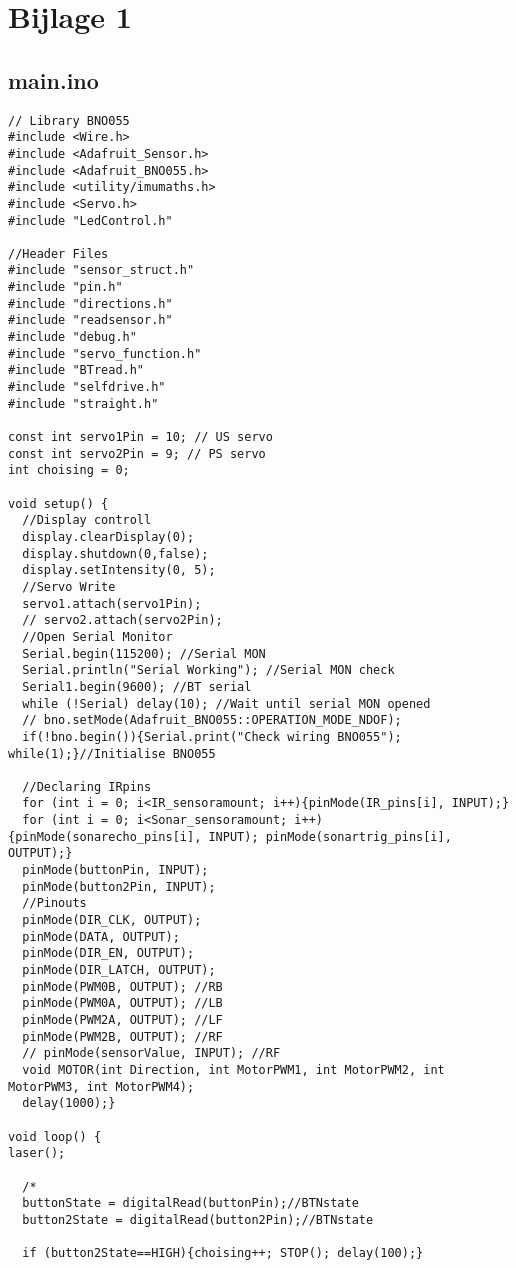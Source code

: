 \section{Bijlage 1}
\subsection{main.ino}
\begin{lstlisting}
// Library BNO055
#include <Wire.h>
#include <Adafruit_Sensor.h>
#include <Adafruit_BNO055.h>
#include <utility/imumaths.h>
#include <Servo.h>
#include "LedControl.h"

//Header Files
#include "sensor_struct.h"	
#include "pin.h"
#include "directions.h"
#include "readsensor.h"
#include "debug.h"
#include "servo_function.h"
#include "BTread.h"
#include "selfdrive.h"
#include "straight.h"

const int servo1Pin = 10; // US servo
const int servo2Pin = 9; // PS servo
int choising = 0;

void setup() {
  //Display controll 
  display.clearDisplay(0);
  display.shutdown(0,false);
  display.setIntensity(0, 5); 
  //Servo Write
  servo1.attach(servo1Pin);
  // servo2.attach(servo2Pin);
  //Open Serial Monitor
  Serial.begin(115200); //Serial MON
  Serial.println("Serial Working"); //Serial MON check
  Serial1.begin(9600); //BT serial
  while (!Serial) delay(10); //Wait until serial MON opened
  // bno.setMode(Adafruit_BNO055::OPERATION_MODE_NDOF);
  if(!bno.begin()){Serial.print("Check wiring BNO055"); while(1);}//Initialise BNO055
  
  //Declaring IRpins
  for (int i = 0; i<IR_sensoramount; i++){pinMode(IR_pins[i], INPUT);}
  for (int i = 0; i<Sonar_sensoramount; i++){pinMode(sonarecho_pins[i], INPUT); pinMode(sonartrig_pins[i], OUTPUT);}
  pinMode(buttonPin, INPUT);
  pinMode(button2Pin, INPUT);
  //Pinouts
  pinMode(DIR_CLK, OUTPUT);
  pinMode(DATA, OUTPUT);
  pinMode(DIR_EN, OUTPUT);
  pinMode(DIR_LATCH, OUTPUT);
  pinMode(PWM0B, OUTPUT); //RB
  pinMode(PWM0A, OUTPUT); //LB
  pinMode(PWM2A, OUTPUT); //LF
  pinMode(PWM2B, OUTPUT); //RF 
  // pinMode(sensorValue, INPUT); //RF 
  void MOTOR(int Direction, int MotorPWM1, int MotorPWM2, int MotorPWM3, int MotorPWM4);
  delay(1000);}

void loop() {
laser();

  /*
  buttonState = digitalRead(buttonPin);//BTNstate
  button2State = digitalRead(button2Pin);//BTNstate
  
  if (button2State==HIGH){choising++; STOP(); delay(100);}


\end{lstlisting}
